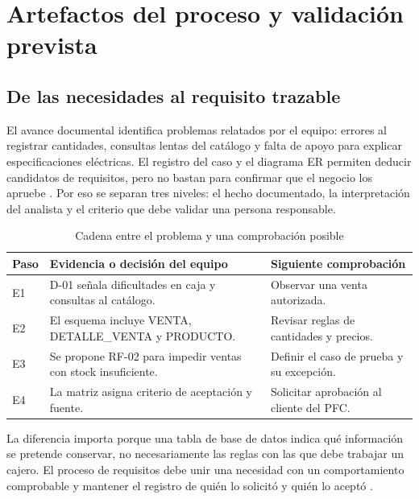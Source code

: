 \section{Artefactos del proceso y validación prevista}
\subsection{De las necesidades al requisito trazable}
El avance documental identifica problemas relatados por el equipo: errores al registrar cantidades, consultas lentas del catálogo y falta de apoyo para explicar especificaciones eléctricas. El registro del caso y el diagrama ER permiten deducir candidatos de requisitos, pero no bastan para confirmar que el negocio los apruebe \cite{basePFC2026,erPFC2026,iso29148}. Por eso se separan tres niveles: el hecho documentado, la interpretación del analista y el criterio que debe validar una persona responsable.

\begin{table}[!ht]
\centering\scriptsize
\caption{Cadena entre el problema y una comprobación posible}
\label{tab:cadena14}
\begin{tabularx}{\columnwidth}{@{}P{0.6cm}Y P{1.4cm}@{}}
\toprule Paso & Evidencia o decisión del equipo & Siguiente comprobación\\\midrule
E1 & D-01 señala dificultades en caja y consultas al catálogo. & Observar una venta autorizada.\\
E2 & El esquema incluye VENTA, DETALLE\_VENTA y PRODUCTO. & Revisar reglas de cantidades y precios.\\
E3 & Se propone RF-02 para impedir ventas con stock insuficiente. & Definir el caso de prueba y su excepción.\\
E4 & La matriz asigna criterio de aceptación y fuente. & Solicitar aprobación al cliente del PFC.\\
\bottomrule
\end{tabularx}
\end{table}

La diferencia importa porque una tabla de base de datos indica qué información se pretende conservar, no necesariamente las reglas con las que debe trabajar un cajero. El proceso de requisitos debe unir una necesidad con un comportamiento comprobable y mantener el registro de quién lo solicitó y quién lo aceptó \cite{iso29148,pohl2025}.

